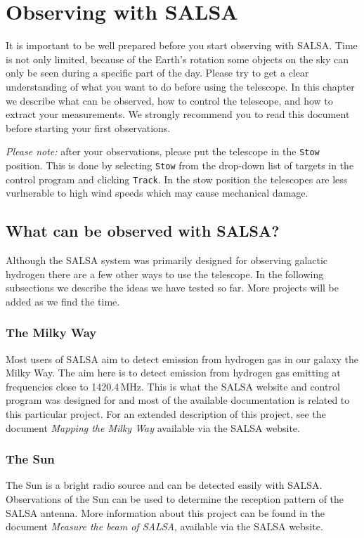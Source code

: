 \chapter{Observing with SALSA}
It is important to be well prepared before you start observing with SALSA.
Time is not only limited, because of the Earth's rotation some objects on the
sky can only be seen during a specific part of the day.  Please try to get a
clear understanding of what you want to do before using the telescope.  In this
chapter we describe what can be observed, how to control the telescope, and how
to extract your measurements. We strongly recommend you to read this document
before starting your first observations. 

\emph{Please note:} after your observations, please put the telescope in the
\verb!Stow! position. This is done by selecting \verb!Stow! from the drop-down 
list of targets in the control program and clicking \verb!Track!. In the stow
position the telescopes are less vurlnerable to high wind speeds which may
cause mechanical damage.

\section{What can be observed with SALSA?}
Although the SALSA system was primarily designed for observing galactic
hydrogen there are a few other ways to use the telescope. In the following
subsections we describe the ideas we have tested so far. More projects
will be added as we find the time.

\subsection{The Milky Way}
Most users of SALSA aim to detect emission from hydrogen gas in our galaxy the
Milky Way.  The aim here is to detect emission from hydrogen gas emitting at
frequencies close to 1420.4\,MHz.  This is what the SALSA website and control
program was designed for and most of the available documentation is related to
this particular project. For an extended description of this project, see the
document \emph{Mapping the Milky Way} available via the SALSA website.

\subsection{The Sun}
The Sun is a bright radio source and can be detected easily with SALSA. 
Observations of the Sun can be used to determine the reception pattern
of the SALSA antenna. More information about this project can be found
in the document \emph{Measure the beam of SALSA}, available via the SALSA
website.

